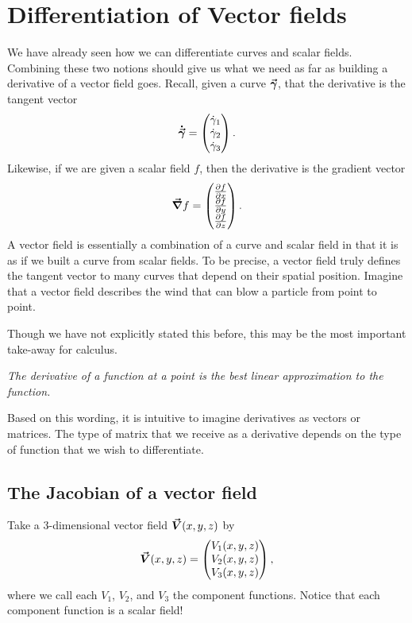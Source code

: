 \section{Differentiation of Vector fields}
        We have already seen how we can differentiate curves and scalar fields.  Combining these two notions should give us what we need as far as building a derivative of a vector field goes.  Recall, given a curve $\boldsymbol{\vec{\gamma}}$, that the derivative is the tangent vector
        \[
        \boldsymbol{\dot{\vec{\gamma}}} = \begin{pmatrix} \dot{\gamma}_1 \\ \dot{\gamma}_2 \\ \dot{\gamma}_3 \end{pmatrix}.
        \]
        Likewise, if we are given a scalar field $f$, then the derivative is the gradient vector
        \[
        \boldsymbol{\vec{\nabla}} f = \begin{pmatrix} \frac{\partial f}{\partial x} \\ \frac{\partial f}{\partial y} \\ \frac{\partial f}{\partial z} \end{pmatrix}.
        \]
        A vector field is essentially a combination of a curve and scalar field in that it is as if we built a curve from scalar fields.  To be precise, a vector field truly defines the tangent vector to many curves that depend on their spatial position.  Imagine that a vector field describes the wind that can blow a particle from point to point.
       
        
        \begin{remark}
        Though we have not explicitly stated this before, this may be the most important take-away for calculus.
        
        \emph{The derivative of a function at a point is the best linear approximation to the function.} 
        
        Based on this wording, it is intuitive to imagine derivatives as vectors or matrices. The type of matrix that we receive as a derivative depends on the type of function that we wish to differentiate.  
        \end{remark}

\subsection{The Jacobian of a vector field}
		        Take a 3-dimensional vector field $\boldsymbol{\vec{V}}(x,y,z)$ by
		        \[
		        \boldsymbol{\vec{V}}(x,y,z)=\begin{pmatrix} V_1(x,y,z) \\ V_2(x,y,z) \\ V_3(x,y,z)\end{pmatrix},
		        \]
		        where we call each $V_1$, $V_2$, and $V_3$ the component functions.  Notice that each component function is a scalar field!
		        
